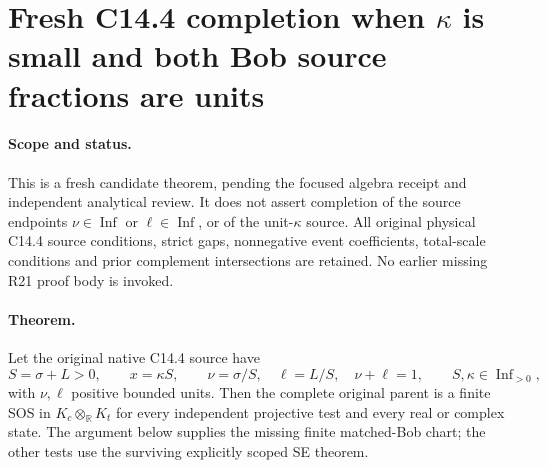 \section{Fresh C14.4 completion when $\kappa$ is small and both Bob source fractions are units}
\label{sec:new-c144-finite-matched}

\paragraph{Scope and status.}
This is a fresh candidate theorem, pending the focused algebra receipt
and independent analytical review. It does not assert completion of
the source endpoints $\nu\in\operatorname{Inf}$ or
$\ell\in\operatorname{Inf}$, or of the unit-$\kappa$ source.
All original physical C14.4 source conditions, strict gaps,
nonnegative event coefficients, total-scale conditions and prior
complement intersections are retained. No earlier missing R21 proof
body is invoked.

\paragraph{Theorem.}
Let the original native C14.4 source have
\[
 S=\sigma+L>0,\qquad x=\kappa S,\qquad
 \nu=\sigma/S,\quad\ell=L/S,\quad\nu+\ell=1,
 \qquad S,\kappa\in\operatorname{Inf}_{>0},
 \tag{FM1}
\]
with $\nu,\ell$ positive bounded units. Then the complete original
parent is a finite SOS in $K_c\otimes_{\mathbb R}K_t$ for every
independent projective test and every real or complex state.
The argument below supplies the missing finite matched-Bob chart;
the other tests use the surviving explicitly scoped SE theorem.

